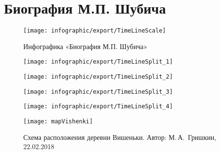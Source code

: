 ﻿\section{Биография М.П. Шубича}

\begin{figure}[H]
\texttt{[image: infographic/export/TimeLineScale]}
\caption{Инфографика «Биография М.П. Шубича»}
\label{fig:TimeLineScale}
\end{figure}

\clearpage

\begin{figure}[H]
\texttt{[image: infographic/export/TimeLineSplit\_1]}
\label{fig:TimeLineSplit_1}
\end{figure}

\clearpage

\begin{figure}[t]
\texttt{[image: infographic/export/TimeLineSplit\_2]}
\label{fig:TimeLineSplit_2}
\end{figure}

\clearpage

\begin{figure}[t]
\texttt{[image: infographic/export/TimeLineSplit\_3]}
\label{fig:TimeLineSplit_3}
\end{figure}

\clearpage

\begin{figure}[t]
\texttt{[image: infographic/export/TimeLineSplit\_4]}
\label{fig:TimeLineSplit_4}
\end{figure}

\clearpage



\begin{figure}[h]
\texttt{[image: mapVishenki]}
\caption{Схема расположения деревни Вишеньки. Автор: М.\,А.~Гришкин, 22.02.2018}
\label{fig:mapVishenki}
\end{figure}
 
